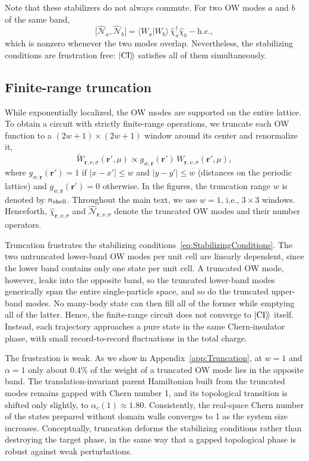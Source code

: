 \documentclass[aps,prb,twocolumn,superscriptaddress,longbibliography,floatfix]{revtex4-2}
\newcommand{\mc}[1]{\mathcal{#1}}
\newcommand{\mr}[1]{\mathrm{#1}}
\newcommand{\bfr}{\boldsymbol r}
\newcommand{\kett}[1]{\ket{#1}\!\rangle}
\newcommand{\CI}{\kett{\mr{CI}}}
\begin{document}
Note that these stabilizers do not always commute. For two OW modes $a$ and $b$ of the same band,
\begin{equation}
    \big[\hat{\mc N}_a,\hat{\mc N}_b\big]=\langle W_a|W_b\rangle\,\hat\chi^\dagger_a\hat\chi_b-\mr{h.c.},
    \label{eq:StabilizerCommutator}
\end{equation}
which is nonzero whenever the two modes overlap. Nevertheless, the stabilizing conditions are frustration free: $\CI$ satisfies all of them simultaneously.

\subsection{Finite-range truncation}
\label{sec:TruncatedOW}

While exponentially localized, the OW modes are supported on the entire lattice. To obtain a circuit with strictly finite-range operations, we truncate each OW function to a $(2w+1)\times(2w+1)$ window around its center and renormalize it,
\begin{equation}
    \widetilde W_{\bfr,\nu,\sigma}(\bfr',\mu)\propto g_{w,\bfr}(\bfr')\,W_{\bfr,\nu,\sigma}(\bfr',\mu),
    \label{eq:TruncatedOW}
\end{equation}
where $g_{w,\bfr}(\bfr')=1$ if $|x-x'|\leq w$ and $|y-y'|\leq w$ (distances on the periodic lattice) and $g_{w,\bfr}(\bfr')=0$ otherwise. In the figures, the truncation range $w$ is denoted by $n_{\rm shell}$. Throughout the main text, we use $w=1$, i.e., $3\times3$ windows. Henceforth, $\hat\chi_{\bfr,\nu,\sigma}$ and $\hat{\mc N}_{\bfr,\nu,\sigma}$ denote the truncated OW modes and their number operators.

Truncation frustrates the stabilizing conditions~\eqref{eq:StabilizingConditions}. The two untruncated lower-band OW modes per unit cell are linearly dependent, since the lower band contains only one state per unit cell. A truncated OW mode, however, leaks into the opposite band, so the truncated lower-band modes generically span the entire single-particle space, and so do the truncated upper-band modes. No many-body state can then fill all of the former while emptying all of the latter. Hence, the finite-range circuit does not converge to $\CI$ itself. Instead, each trajectory approaches a pure state in the same Chern-insulator phase, with small record-to-record fluctuations in the total charge.

The frustration is weak. As we show in Appendix~\ref{app:Truncation}, at $w=1$ and $\alpha=1$ only about $0.4\%$ of the weight of a truncated OW mode lies in the opposite band. The translation-invariant parent Hamiltonian built from the truncated modes remains gapped with Chern number 1, and its topological transition is shifted only slightly, to $\alpha_c(1)\approx1.80$. Consistently, the real-space Chern number of the states prepared without domain walls converges to 1 as the system size increases. Conceptually, truncation deforms the stabilizing conditions rather than destroying the target phase, in the same way that a gapped topological phase is robust against weak perturbations.
\end{document}
